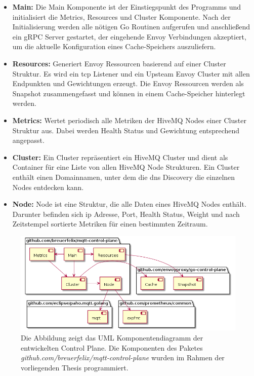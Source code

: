 \begin{itemize}
  \item \textbf{Main:} Die Main Komponente ist der Einstiegspunkt des Programms und initialisiert die Metrics, Resources und Cluster Komponente. Nach der Initialisierung werden alle nötigen Go Routinen aufgerufen und anschlie{\ss}end ein gRPC Server gestartet, der eingehende Envoy Verbindungen akzeptiert, um die aktuelle Konfiguration eines Cache-Speichers auszuliefern.
  \item \textbf{Resources:} Generiert Envoy Ressourcen basierend auf einer Cluster Struktur. Es wird ein \ac{tcp} Listener und ein Upsteam Envoy Cluster mit allen Endpunkten und Gewichtungen erzeugt. Die Envoy Ressourcen werden als Snapshot zusammengefasst und können in einem Cache-Speicher hinterlegt werden.
  \item \textbf{Metrics:} Wertet periodisch alle Metriken der HiveMQ Nodes einer Cluster Struktur aus. Dabei werden Health Status und Gewichtung entsprechend angepasst.
  \item \textbf{Cluster:} Ein Cluster repräsentiert ein HiveMQ Cluster und dient als Container für eine Liste von allen HiveMQ Node Strukturen. Ein Cluster enthält einen Domainnamen, unter dem die \ac{dns} Discovery die einzelnen Nodes entdecken kann.
  \item \textbf{Node:} Node ist eine Struktur, die alle Daten eines HiveMQ Nodes enthält. Darunter befinden sich \ac{ip} Adresse, Port, Health Status, Weight und nach Zeitstempel sortierte Metriken für einen bestimmten Zeitraum.
\end{itemize}
\begin{figure}
    \centering
    \includegraphics[scale=0.5]{gen/component-diagram.png}
    \caption{Die Abbildung zeigt das UML Komponentendiagramm der entwickelten Control Plane. Die Komponenten des Paketes \textit{github.com/breuerfelix/mqtt-control-plane} wurden im Rahmen der vorliegenden Thesis programmiert.}
    \label{fig:component-diagram}
\end{figure}
